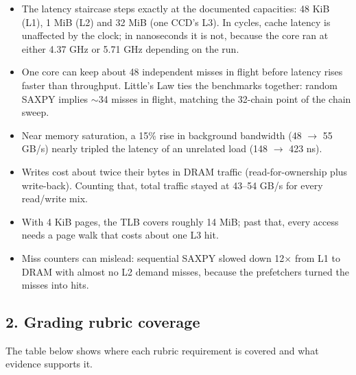 \documentclass[10pt,letterpaper]{article}
\providecommand{\tightlist}{\setlength{\itemsep}{0pt}\setlength{\parskip}{0pt}}
\begin{document}
\begin{itemize}
\tightlist
\item
  The latency staircase steps exactly at the documented
  capacities: 48 KiB (L1), 1 MiB (L2) and 32 MiB (one CCD's
  L3). In cycles, cache latency is unaffected by the clock;
  in nanoseconds it is not, because the core ran at either
  4.37 GHz or 5.71 GHz depending on the run.
\item
  One core can keep about 48 independent misses in flight
  before latency rises faster than throughput. Little's Law
  ties the benchmarks together: random SAXPY implies
  $\sim$34 misses in flight, matching the 32-chain
  point of the chain sweep.
\item
  Near memory saturation, a 15\% rise in background
  bandwidth (48 $\rightarrow$ 55 GB/s) nearly tripled the latency of an
  unrelated load (148 $\rightarrow$ 423 ns).
\item
  Writes cost about twice their bytes in DRAM traffic
  (read-for-ownership plus write-back). Counting that, total
  traffic stayed at 43--54 GB/s for every read/write mix.
\item
  With 4 KiB pages, the TLB covers roughly 14 MiB; past
  that, every access needs a page walk that costs about one
  L3 hit.
\item
  Miss counters can mislead: sequential SAXPY slowed down
  12$\times$ from L1 to DRAM with almost no L2 demand misses,
  because the prefetchers turned the misses into hits.
\end{itemize}

\hypertarget{grading-rubric-coverage}{%
\subsection{2. Grading rubric
coverage}\label{grading-rubric-coverage}}

The table below shows where each rubric requirement is
covered and what evidence supports it.
\end{document}

